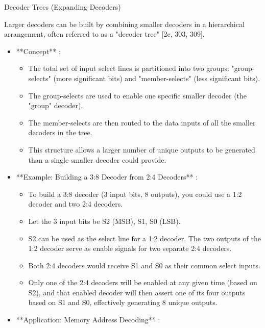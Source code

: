 \documentclass{article}
\begin{document}
Decoder Trees (Expanding Decoders)

Larger decoders can be built by combining smaller decoders in a hierarchical arrangement, often referred to as a "decoder tree" [2c, 303, 309].

\begin{itemize}
    \item **Concept** :
    
        \begin{itemize}
            \item The total set of input select lines is partitioned into two groups: "group-selects" (more significant bits) and "member-selects" (less significant bits).
            \item The group-selects are used to enable one specific smaller decoder (the "group" decoder).
            \item The member-selects are then routed to the data inputs of all the smaller decoders in the tree.
            \item This structure allows a larger number of unique outputs to be generated than a single smaller decoder could provide.
        \end{itemize}
    \item **Example: Building a 3:8 Decoder from 2:4 Decoders** :
    
        \begin{itemize}
            \item To build a 3:8 decoder (3 input bits, 8 outputs), you could use a 1:2 decoder and two 2:4 decoders.
            \item Let the 3 input bits be S2 (MSB), S1, S0 (LSB).
            \item S2 can be used as the select line for a 1:2 decoder. The two outputs of the 1:2 decoder serve as enable signals for two separate 2:4 decoders.
            \item Both 2:4 decoders would receive S1 and S0 as their common select inputs.
            \item Only one of the 2:4 decoders will be enabled at any given time (based on S2), and that enabled decoder will then assert one of its four outputs based on S1 and S0, effectively generating 8 unique outputs.
        \end{itemize}
    \item **Application: Memory Address Decoding** :
    

\end{itemize}
\end{document}
